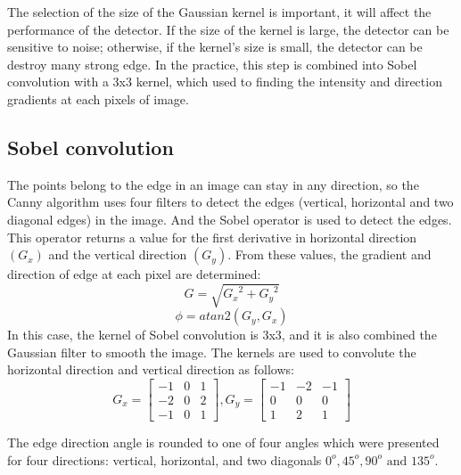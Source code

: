	The selection of the size of the Gaussian kernel is important, it will affect the performance of the detector. If the size of the kernel is large, the detector can be sensitive to noise; otherwise, if the kernel's size is small, the detector can be destroy many strong edge. In the practice, this step is combined into Sobel convolution with a 3x3 kernel, which used to finding the intensity and direction gradients at each pixels of image.
	\subsection{Sobel convolution}
	The points belong to the edge in an image can stay in any direction, so the Canny algorithm uses four filters to detect the edges (vertical, horizontal and two diagonal edges) in the image. And the Sobel operator is used to detect the edges. This operator returns a value for the first derivative in horizontal direction $(G_x)$ and the vertical direction $(G_y)$. From these values, the gradient and direction of edge at each pixel are determined:
	\begin{equation}
		G = \sqrt{{G_x}^2 + {G_y}^2}
	\end{equation}
	\begin{equation}
		\phi = atan2(G_y,G_x)
	\end{equation}
	In this case, the kernel of Sobel convolution is 3x3, and it is also combined the Gaussian filter to smooth the image. The kernels are used to convolute the horizontal direction and vertical direction as follows:
	\begin{equation}
		G_x = 
		\begin{bmatrix}
		-1 & 0 & 1\\
		-2 & 0 & 2\\
		-1 & 0 & 1		
		\end{bmatrix}, 
		G_y = 
		\begin{bmatrix}
		-1 & -2 & -1\\
		0 & 0 & 0\\
		1 & 2 & 1		
		\end{bmatrix}
	\end{equation}
	
	The edge direction angle is rounded to one of four angles which were presented for four directions: vertical, horizontal, and two diagonals $0^o, 45^o, 90^o \text{ and } 135^o$.
